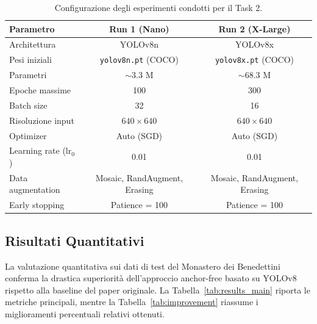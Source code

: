 \documentclass[a4paper,12pt]{report}
\begin{document}
\begin{table}[htbp]
\centering
\caption{Configurazione degli esperimenti condotti per il Task 2.}
\label{tab:setup}
\begin{tabular}{lcc}
\toprule
\textbf{Parametro} & \textbf{Run 1 (Nano)} & \textbf{Run 2 (X-Large)} \\
\midrule
Architettura        & YOLOv8n              & YOLOv8x \\
Pesi iniziali       & \texttt{yolov8n.pt} (COCO) & \texttt{yolov8x.pt} (COCO) \\
Parametri           & $\sim$3.3 M          & $\sim$68.3 M \\
Epoche massime      & 100                  & 300 \\
Batch size          & 32                   & 16 \\
Risoluzione input   & $640 \times 640$     & $640 \times 640$ \\
Optimizer           & Auto (SGD)           & Auto (SGD) \\
Learning rate ($\text{lr}_0$) & 0.01       & 0.01 \\
Data augmentation   & Mosaic, RandAugment, Erasing & Mosaic, RandAugment, Erasing \\
Early stopping      & Patience = 100       & Patience = 100 \\
\bottomrule
\end{tabular}
\end{table}

\FloatBarrier

\subsection{Risultati Quantitativi}

La valutazione quantitativa sui dati di test del Monastero dei Benedettini conferma la drastica superiorità dell'approccio anchor-free basato su YOLOv8 rispetto alla baseline del paper originale. La Tabella~\ref{tab:results_main} riporta le metriche principali, mentre la Tabella~\ref{tab:improvement} riassume i miglioramenti percentuali relativi ottenuti.
\end{document}
